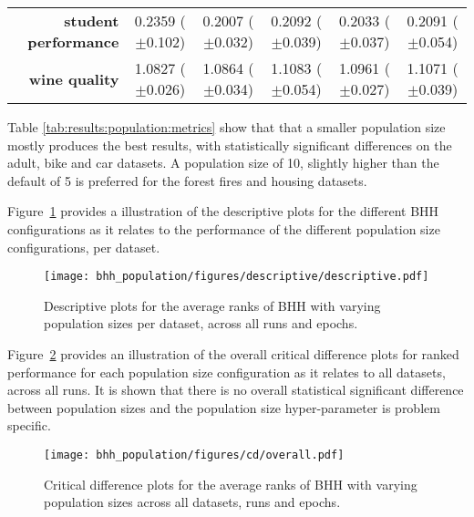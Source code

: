 \begin{table}[htbp]
{\begin{tabular}{r|ccccc}
			\textbf{student performance} & \cellcolor[rgb]{ .973,  .412,  .42}0.2359 ($\pm$0.102)  & \cellcolor[rgb]{ .388,  .745,  .482}0.2007 ($\pm$0.032) & \cellcolor[rgb]{ 1,  .922,  .518}0.2092 ($\pm$0.039)    & \cellcolor[rgb]{ .573,  .796,  .49}0.2033 ($\pm$0.037) & \cellcolor[rgb]{ 1,  .922,  .518}0.2091 ($\pm$0.054)    \\
			\textbf{wine quality}        & \cellcolor[rgb]{ .388,  .745,  .482}1.0827 ($\pm$0.026) & \cellcolor[rgb]{ .553,  .792,  .49}1.0864 ($\pm$0.034)  & \cellcolor[rgb]{ .973,  .412,  .42}1.1083 ($\pm$0.054)  & \cellcolor[rgb]{ 1,  .922,  .518}1.0961 ($\pm$0.027)   & \cellcolor[rgb]{ .976,  .463,  .431}1.1071 ($\pm$0.039) \\
		\end{tabular}%

	}
\end{table}%

Table \ref{tab:results:population:metrics} show that that a smaller population size mostly produces the best results, with statistically significant differences on the adult, bike and car datasets. A population size of 10, slightly higher than the default of 5 is preferred for the forest fires and housing datasets.

Figure~\ref{fig:results:population:descriptive:descriptive} provides a illustration of the descriptive plots for the different \acs{BHH} configurations as it relates to the performance of the different population size configurations, per dataset.

\begin{figure}[htbp]
	\centering
	\texttt{[image: bhh\_population/figures/descriptive/descriptive.pdf]}
	\caption{Descriptive plots for the average ranks of \acs{BHH} with varying population sizes per dataset, across all runs and epochs.}
	\label{fig:results:population:descriptive:descriptive}
\end{figure}

Figure~\ref{fig:results:population:descriptive:cd} provides an illustration of the overall critical difference plots for ranked performance for each population size configuration as it relates to all datasets, across all runs. It is shown that there is no overall statistical significant difference between population sizes and the population size hyper-parameter is problem specific.

\begin{figure}[htbp]
	\centering
	\texttt{[image: bhh\_population/figures/cd/overall.pdf]}
	\caption{Critical difference plots for the average ranks of \acs{BHH} with varying population sizes across all datasets, runs and epochs.}
	\label{fig:results:population:descriptive:cd}
\end{figure}

